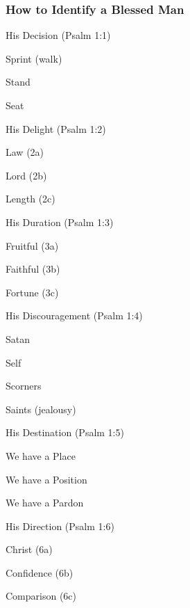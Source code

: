 \subsubsection{How to Identify a Blessed Man}
\begin{compactenum}[I.][6]
	\item His Decision (Psalm 1:1)
	\begin{compactenum}[A.]
		\item Sprint (walk)
		\item Stand
		\item Seat
	\end{compactenum}	
	\item His Delight (Psalm 1:2)
	\begin{compactenum}[A.]
		\item Law (2a)
		\item Lord (2b)
		\item Length (2c)
	\end{compactenum}	
	\item His Duration (Psalm 1:3)
	\begin{compactenum}[A.]
		\item Fruitful (3a)
		\item Faithful (3b)
		\item Fortune (3c)
	\end{compactenum}	
	\item His Discouragement (Psalm 1:4)
	\begin{compactenum}[A.]
		\item Satan
		\item Self
		\item Scorners
		\item Saints (jealousy)
	\end{compactenum}	
	\item His Destination (Psalm 1:5)
	\begin{compactenum}[A.]
		\item We have a Place
		\item We have a Position
		\item We have a Pardon
	\end{compactenum}	
	\item His Direction (Psalm 1:6)
	\begin{compactenum}[A.]
		\item Christ (6a)
		\item Confidence (6b)
		\item Comparison (6c)
	\end{compactenum}	
\end{compactenum}

